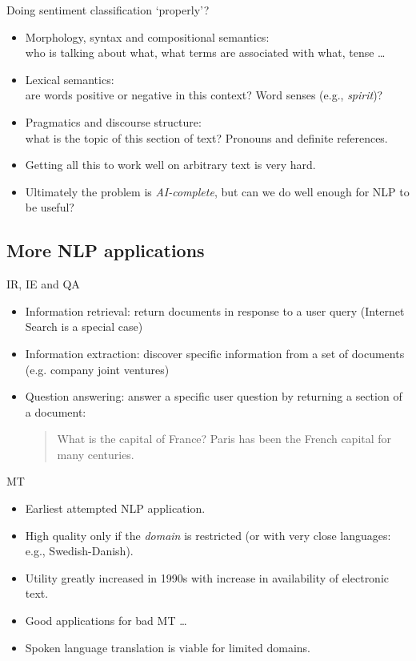 \documentclass[compress]{beamer}
\begin{document}
\begin{frame}{Doing sentiment classification `properly'?}
  \begin{itemize}
  \item Morphology, syntax and compositional semantics:\\
    who is talking about what, what terms are associated with what,
    tense \ldots
  \item Lexical semantics:\\ are words positive or negative
    \alert{in this context}?  Word senses (e.g., {\it spirit})?\\
  \item Pragmatics and discourse structure:\\
    what is the topic of this section of text?  Pronouns and definite
    references.
  \item Getting all this to work well on arbitrary text is very hard.
  \item Ultimately the problem is \emph{AI-complete}, but can we do
    well enough for NLP to be useful?
\end{itemize}
\end{frame}


\subsection{More NLP applications}

\begin{frame}{IR, IE and QA}
  \begin{itemize}
  \item Information retrieval: return documents in response to a user
    query (Internet Search is a special case)
  \item Information extraction: discover specific information from a
    set of documents (e.g. company joint ventures)
  \item Question answering: answer a specific user question by
    returning a section of a document:
    \begin{quote}
      What is the capital of France? Paris has been the French
      capital for many centuries.
    \end{quote}
\end{itemize}
\end{frame}

\begin{frame}{MT}
  \begin{itemize}
  \item Earliest attempted NLP application.
  \item High quality only if the \emph{domain} is restricted (or
    with very close languages: e.g., Swedish-Danish).
  \item Utility greatly increased in 1990s with increase in
    availability of electronic text.
  \item Good applications for bad MT \ldots
  \item Spoken language translation is viable for limited domains.
  \end{itemize}
\end{frame}
\end{document}
